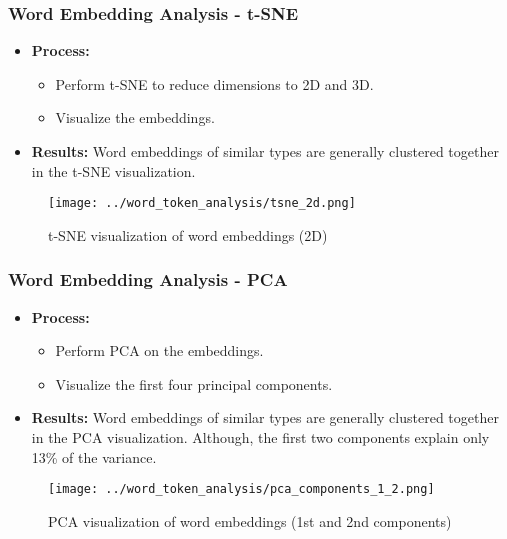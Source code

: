 \documentclass{beamer}
\begin{document}
\begin{frame}
\frametitle{Word Embedding Analysis - t-SNE}
\begin{itemize}
    \item \textbf{Process:}
    \begin{itemize}
        \item Perform t-SNE to reduce dimensions to 2D and 3D.
        \item Visualize the embeddings.
    \end{itemize}
    \item \textbf{Results:} Word embeddings of similar types are generally clustered together in the t-SNE visualization.
\end{itemize}
\begin{figure}[h]
    \centering
    \texttt{[image: ../word\_token\_analysis/tsne\_2d.png]}
    \caption{t-SNE visualization of word embeddings (2D)}
\end{figure}
\end{frame}

\begin{frame}
\frametitle{Word Embedding Analysis - PCA}
\begin{itemize}
    \item \textbf{Process:}
    \begin{itemize}
        \item Perform PCA on the embeddings.
        \item Visualize the first four principal components.
    \end{itemize}
    \item \textbf{Results:} Word embeddings of similar types are generally clustered together in the PCA visualization. Although, the first two components explain only 13\% of the variance.
\end{itemize}
\begin{figure}[h]
    \centering
    \texttt{[image: ../word\_token\_analysis/pca\_components\_1\_2.png]}
    \caption{PCA visualization of word embeddings (1st and 2nd components)}
\end{figure}
\end{frame}
\end{document}
